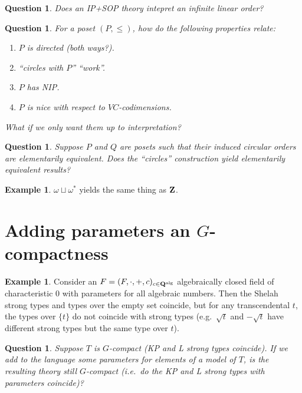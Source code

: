 \documentclass[final,a4paper,12pt]{amsart}
\newtheorem{qu}[con]{Question}
\theoremstyle{remark}
\theoremstyle{definition}
\newtheorem{ex}[thm]{Example}
\begin{document}
	\begin{qu}
		Does an IP+SOP theory intepret an infinite linear order?
	\end{qu}
	
	
	\begin{qu}
		For a poset $(P,\leq)$, how do the following properties relate:
		\begin{enumerate}
			\item
			$P$ is directed (both ways?).
			\item
			``circles with $P$'' ``work''.
			\item
			$P$ has NIP.
			\item
			$P$ is nice with respect to $VC$-codimensions.
		\end{enumerate}
		What if we only want them up to interpretation?
	\end{qu}
	
	\begin{qu}
		Suppose $P$ and $Q$ are posets such that their induced circular orders are elementarily equivalent. Does the ``circles'' construction yield elementarily equivalent results?
	\end{qu}
	
	\begin{ex}
		$\omega\sqcup \omega^*$ yields the same thing as ${\bf Z}$.
	\end{ex}
	
	\section{Adding parameters an $G$-compactness}
	
	\begin{ex}
		Consider an $F=(F,\cdot,+,c)_{c\in {\bf Q}^{\textrm{alg}}}$ algebraically closed field of characteristic $0$ with parameters for all algebraic numbers. Then the Shelah strong types and types over the empty set coincide, but for any transcendental $t$, the types over $\{t\}$ do not coincide with strong types (e.g.\ $\sqrt{t}$ and $-\sqrt{t}$ have different strong types but the same type over $t$).
	\end{ex}
	
	\begin{qu}
		Suppose $T$ is $G$-compact (KP and L strong types coincide). If we add to the language some parameters for elements of a model of $T$, is the resulting theory still $G$-compact (i.e.\ do the KP and L strong types with parameters coincide)?
	\end{qu}
	
\end{document}
